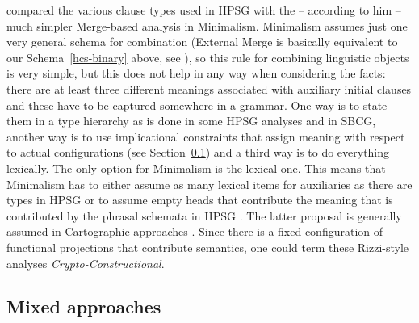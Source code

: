 \documentclass[output=paper]{langsci/langscibook}
\begin{document}
\zl
\citet{Chomsky2010a} compared the various clause types used in HPSG with the -- according to him --
much simpler Merge-based analysis in Minimalism. Minimalism assumes just one very general schema for
combination (External Merge is basically equivalent to our Schema~\ref{hcs-binary} above, see
), so this rule for combining linguistic objects is very simple, but this
does not help in any way when considering the facts: there are at least three different meanings
associated with auxiliary initial clauses and these have to be captured somewhere in a grammar. One
way is to state them in a type hierarchy as is done in some HPSG analyses and in SBCG, another way
is to use implicational constraints that assign meaning with respect to actual configurations
(see Section~\ref{sec-mixed-approaches}) and a third way is to do everything lexically. The only option for
Minimalism is the lexical one. This means that Minimalism has to either assume as many lexical items
for auxiliaries as there are types in HPSG or to assume empty heads that contribute the meaning that
is contributed by the phrasal schemata in HPSG \parencites[Section~5]{Borsley2006a}{BM2018Minimalism}. The latter proposal is generally assumed in
Cartographic approaches \citep{Rizzi97a-u}. Since there is a fixed configuration of functional projections
that contribute semantics, one could term these Rizzi-style analyses \emph{Crypto-Constructional}.

\subsection{Mixed approaches}
\label{sec-mixed-approaches}
\end{document}
